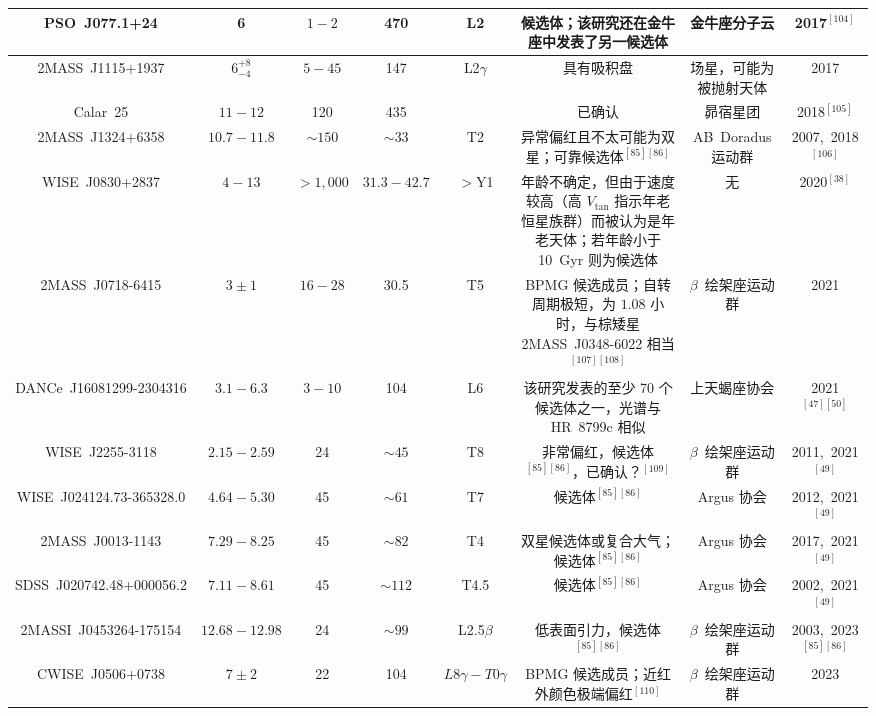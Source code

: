\begin{table}[ht]
\begin{tabular}{|c|c|c|c|c|c|c|c|}
\hline
PSO~J077.1+24 & 6 & $1-2$ & 470 & L2 & 候选体；该研究还在金牛座中发表了另一候选体 & 金牛座分子云 & 2017$^{[104]}$\\
\hline
2MASS~J1115+1937 & $6^{+8}_{-4}$ & $5-45$ & 147  & L2$\gamma$ & 具有吸积盘  & 场星，可能为被抛射天体 & 2017\\
\hline
Calar~25 & $11-12$ & 120 & 435  &  & 已确认 & 昴宿星团 & 2018$^{[105]}$\\ 
\hline
2MASS~J1324+6358 & $10.7-11.8$ & $\sim150$ & $\sim33$ & T2 & 异常偏红且不太可能为双星；可靠候选体$^{[85][86]}$ & AB~Doradus 运动群 & 2007,~2018$^{[106]}$\\
\hline
WISE~J0830+2837 & $4-13$ & $>1{,}000$ & $31.3-42.7$ & $>$Y1 & 年龄不确定，但由于速度较高（高 $V_{\mathrm{tan}}$ 指示年老恒星族群）而被认为是年老天体；若年龄小于 10~Gyr 则为候选体 & 无 & 2020$^{[38]}$\\
\hline
2MASS~J0718-6415 & $3\pm1$ & $16-28$ & 30.5 & T5 & BPMG 候选成员；自转周期极短，为 $1.08$ 小时，与棕矮星 2MASS~J0348-6022 相当$^{[107][108]}$ & $\beta$~绘架座运动群 & 2021\\
\hline
DANCe~J16081299-2304316 & $3.1-6.3$ & $3-10$ & 104 & L6 & 该研究发表的至少 70 个候选体之一，光谱与 HR~8799c 相似 & 上天蝎座协会 & 2021$^{[47][50]}$\\
\hline
WISE~J2255-3118 & $2.15-2.59$ & 24 & $\sim45$ & T8 & 非常偏红，候选体$^{[85][86]}$，已确认？$^{[109]}$ & $\beta$~绘架座运动群 & 2011,~2021$^{[49]}$\\
\hline
WISE~J024124.73-365328.0 & $4.64-5.30$ & 45 & $\sim61$ & T7 & 候选体$^{[85][86]}$ & Argus 协会 & 2012,~2021$^{[49]}$\\
\hline
2MASS~J0013-1143 & $7.29-8.25$ & 45 & $\sim82$ & T4 & 双星候选体或复合大气；候选体$^{[85][86]}$ & Argus 协会 & 2017,~2021$^{[49]}$\\
\hline
SDSS~J020742.48+000056.2 & $7.11-8.61$ & 45 & $\sim112$ & T4.5 & 候选体$^{[85][86]}$ & Argus 协会 & 2002,~2021$^{[49]}$\\
\hline
2MASSI~J0453264-175154 & $12.68-12.98$ & 24 & $\sim99$ & L2.5$\beta$ & 低表面引力，候选体$^{[85][86]}$ & $\beta$~绘架座运动群 & 2003,~2023$^{[85][86]}$\\
\hline
CWISE~J0506+0738 & $7\pm2$ & 22 & 104 & $L8\gamma-T0\gamma$ & BPMG 候选成员；近红外颜色极端偏红$^{[110]}$ & $\beta$~绘架座运动群 & 2023\\
\hline
\end{tabular}
\end{table}
